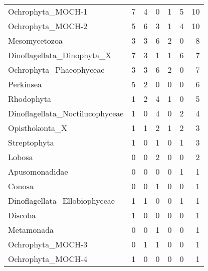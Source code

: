 \begin{table}[ht]
\begin{tabular}{lrrrrrr}
  Ochrophyta\_MOCH-1 & 7 & 4 & 0 & 1 & 5 & 10 \\ 
  Ochrophyta\_MOCH-2 & 5 & 6 & 3 & 1 & 4 & 10 \\ 
  Mesomycetozoa & 3 & 3 & 6 & 2 & 0 & 8 \\ 
  Dinoflagellata\_Dinophyta\_X & 7 & 3 & 1 & 1 & 6 & 7 \\ 
  Ochrophyta\_Phaeophyceae & 3 & 3 & 6 & 2 & 0 & 7 \\ 
  Perkinsea & 5 & 2 & 0 & 0 & 0 & 6 \\ 
  Rhodophyta & 1 & 2 & 4 & 1 & 0 & 5 \\ 
  Dinoflagellata\_Noctilucophyceae & 1 & 0 & 4 & 0 & 2 & 4 \\ 
  Opisthokonta\_X & 1 & 1 & 2 & 1 & 2 & 3 \\ 
  Streptophyta & 1 & 0 & 1 & 0 & 1 & 3 \\ 
  Lobosa & 0 & 0 & 2 & 0 & 0 & 2 \\ 
  Apusomonadidae & 0 & 0 & 0 & 0 & 1 & 1 \\ 
  Conosa & 0 & 0 & 1 & 0 & 0 & 1 \\ 
  Dinoflagellata\_Ellobiophyceae & 1 & 1 & 0 & 0 & 1 & 1 \\ 
  Discoba & 1 & 0 & 0 & 0 & 0 & 1 \\ 
  Metamonada & 0 & 0 & 1 & 0 & 0 & 1 \\ 
  Ochrophyta\_MOCH-3 & 0 & 1 & 1 & 0 & 0 & 1 \\ 
  Ochrophyta\_MOCH-4 & 1 & 0 & 0 & 0 & 0 & 1 \\ 
   \hline
\end{tabular}
\end{table}
